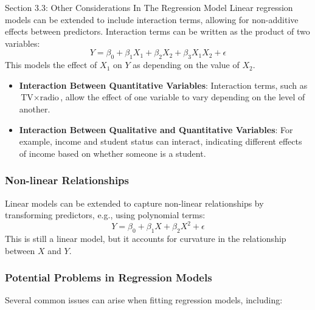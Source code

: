 \begin{notes}{Section 3.3: Other Considerations In The Regression Model}
    Linear regression models can be extended to include interaction terms, allowing for non-additive effects between predictors. Interaction terms can be written as the product of two variables:
    \[
    Y = \beta_0 + \beta_1 X_1 + \beta_2 X_2 + \beta_3 X_1 X_2 + \epsilon
    \]
    This models the effect of \(X_1\) on \(Y\) as depending on the value of \(X_2\).
    
    \begin{highlight}
        \begin{itemize}
            \item \textbf{Interaction Between Quantitative Variables}: Interaction terms, such as $\text{TV} \times \text{radio}$, allow the effect of one variable to vary depending on the level of another.
            \item \textbf{Interaction Between Qualitative and Quantitative Variables}: For example, income and student status can interact, indicating different effects of income based on whether someone is a student.
        \end{itemize}
    \end{highlight}
    
    \subsubsection*{Non-linear Relationships}
    
    Linear models can be extended to capture non-linear relationships by transforming predictors, e.g., using polynomial terms:
    \[
    Y = \beta_0 + \beta_1 X + \beta_2 X^2 + \epsilon
    \]
    This is still a linear model, but it accounts for curvature in the relationship between \(X\) and \(Y\).
    
    \subsubsection*{Potential Problems in Regression Models}
    
    Several common issues can arise when fitting regression models, including:
    

\end{notes}
